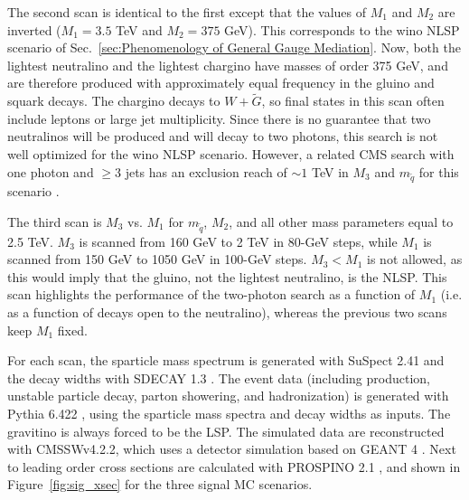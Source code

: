 \documentclass[dissertation.tex]{subfiles}
\begin{document}
The second scan is identical to the first except that the values of $M_{1}$ and $M_{2}$ are inverted ($M_{1} = 3.5$ TeV and $M_{2} = 375$ GeV).  This corresponds to the wino NLSP scenario of Sec.~\ref{sec:Phenomenology of General Gauge Mediation}.  Now, both the lightest neutralino and the lightest chargino have masses of order 375 GeV, and are therefore produced with approximately equal frequency in the gluino and squark decays.  The chargino decays to $W+\tilde{G}$, so final states in this scan often include leptons or large jet multiplicity.  Since there is no guarantee that two neutralinos will be produced and will decay to two photons, this search is not well optimized for the wino NLSP scenario.  However, a related CMS search with one photon and $\geq3$ jets has an exclusion reach of $\sim1$ TeV in $M_{3}$ and $m_{\tilde{q}}$ for this scenario \cite{CMS_GMSB_5fb-1}.

The third scan is $M_{3}$ vs. $M_{1}$ for $m_{\tilde{q}}$, $M_{2}$, and all other mass parameters equal to 2.5 TeV.  $M_{3}$ is scanned from 160 GeV to 2 TeV in 80-GeV steps, while $M_{1}$ is scanned from 150 GeV to 1050 GeV in 100-GeV steps.  $M_{3} < M_{1}$ is not allowed, as this would imply that the gluino, not the lightest neutralino, is the NLSP.  This scan highlights the performance of the two-photon search as a function of $M_{1}$ (i.e. as a function of decays open to the neutralino), whereas the previous two scans keep $M_{1}$ fixed.

For each scan, the sparticle mass spectrum is generated with SuSpect 2.41 \cite{SuSpect} and the decay widths with SDECAY 1.3 \cite{SDECAY}.  The event data (including production, unstable particle decay, parton showering, and hadronization) is generated with Pythia 6.422 \cite{Pythia6}, using the sparticle mass spectra and decay widths as inputs.  The gravitino is always forced to be the LSP.  The simulated data are reconstructed with CMSSWv4.2.2, which uses a detector simulation based on GEANT 4 \cite{GEANT}.  Next to leading order cross sections are calculated with PROSPINO 2.1 \cite{PROSPINO}, and shown in Figure~\ref{fig:sig_xsec} for the three signal MC scenarios.
\end{document}
